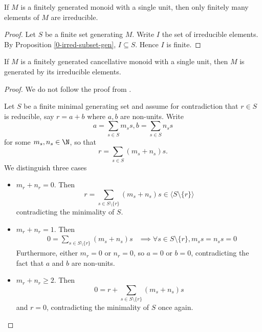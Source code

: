 \begin{proposition}
  \label{0-irred-finite}
  \leanok

  If $M$ is a finitely generated monoid with a single unit, then only finitely many elements of $M$ are irreducible.
\end{proposition}
\begin{proof}
  \leanok

  Let $S$ be a finite set generating $M$. Write $I$ the set of irreducible elements. By Proposition \ref{0-irred-subset-gen}, $I \subseteq S$. Hence $I$ is finite.
\end{proof}


\begin{proposition}
  \label{0-irred-gen}
  \leanok

  If $M$ is a finitely generated cancellative monoid with a single unit, then $M$ is generated by its irreducible elements.
\end{proposition}
\begin{proof}
  \leanok

  We do not follow the proof from \cite{Cox_2011}.

  Let $S$ be a finite minimal generating set and assume for contradiction that $r \in S$ is reducible, say $r = a + b$ where $a, b$ are non-units. Write
  \[a = \sum_{s \in S} m_s s, b = \sum_{s \in S} n_s s\]
  for some $m_s, n_s \in \N$, so that
  \[r = \sum_{s \in S} (m_s + n_s) s.\]
  We distinguish three cases
  \begin{itemize}
    \item $m_r + n_r = 0$. Then
    \[r = \sum_{s \in S \setminus \{r\}} (m_s + n_s) s \in \langle S \setminus \{r\}\rangle\]
    contradicting the minimality of $S$.
    \item $m_r + n_r = 1$. Then
    \begin{align*}
      & 0 = \sum_{s \in S \setminus \{r\}} (m_s + n_s) s
      & \implies \forall s \in S \setminus \{r\}, m_s s = n_s s = 0
    \end{align*}
    Furthermore, either $m_r = 0$ or $n_r = 0$, so $a = 0$ or $b = 0$, contradicting the fact that $a$ and $b$ are non-units.
    \item $m_r + n_r \ge 2$. Then
    \[0 = r + \sum_{s \in S \setminus \{r\}} (m_s + n_s) s\]
    and $r = 0$, contradicting the minimality of $S$ once again.
  \end{itemize}
\end{proof}


